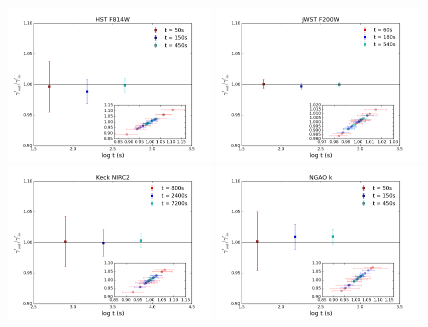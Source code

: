 \documentclass[a4paper,11pt]{article}
\begin{document}


\begin{figure}
\begin{center}
\includegraphics[width=0.48\textwidth]{figures/gamma_0330_anti_4QSOimages_HST.png}
\includegraphics[width=0.48\textwidth]{figures/gamma_0330_anti_4QSOimages_JWST.png} \\
\includegraphics[width=0.48\textwidth]{figures/gamma_0330_anti_4QSOimages_Keck.png}
\includegraphics[width=0.48\textwidth]{figures/gamma_0330_anti_4QSOimages_NGAO.png} \\

\end{center}
\end{figure}
\end{document}
